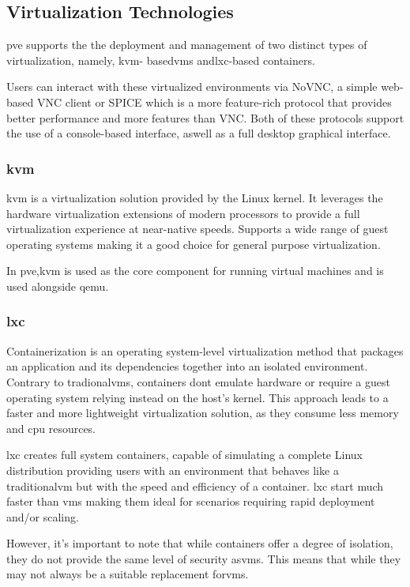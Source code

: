 \subsection{Virtualization Technologies}
\ac{pve} supports the the deployment and management of two distinct types of virtualization, namely, \ac{kvm}- 
based\ac{vm}s and\ac{lxc}-based containers.

Users can interact with these virtualized environments via NoVNC, a simple web-based VNC client or SPICE which is a more
feature-rich protocol that provides better performance and more features than VNC.
Both of these protocols support the use of a console-based interface, aswell as a full desktop graphical interface.


\subsubsection{\ac{kvm}}
\ac{kvm} is a virtualization solution provided by the Linux kernel. It leverages the hardware virtualization extensions 
of modern processors to provide a full virtualization experience at near-native speeds. Supports a wide range of guest 
operating systems making it a good choice for general purpose virtualization.

In \ac{pve},\ac{kvm} is used as the core component for running virtual machines and is used alongside \ac{qemu}.

\subsubsection{\ac{lxc}}
Containerization is an operating system-level virtualization method that packages an application and its dependencies
together into an isolated environment. Contrary to tradional\ac{vm}s, containers dont emulate hardware or require a 
guest operating system relying instead on the host's kernel. This approach leads to a faster and more lightweight 
virtualization solution, as they consume less memory and cpu resources.

\ac{lxc} creates full system containers, capable of simulating a complete Linux distribution providing users with an 
environment that behaves like a traditional\ac{vm} but with the speed and efficiency of a container. \ac{lxc} start 
much faster than \ac{vm}s making them ideal for scenarios requiring rapid deployment and/or scaling.

However, it's important to note that while containers offer a degree of isolation, they do not provide the same level of
security as\ac{vm}s. This means that while they may not always be a suitable replacement for\ac{vm}s.

